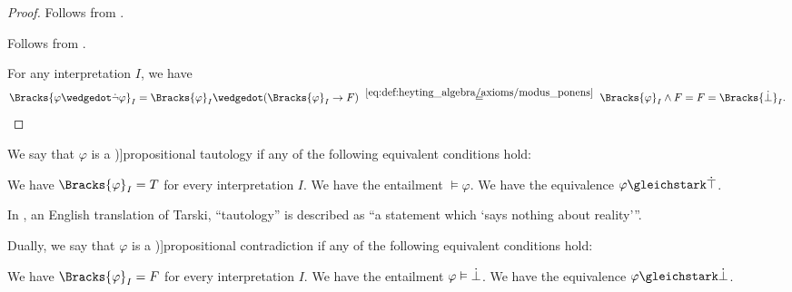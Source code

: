 \begin{proof}
   Follows from .

   Follows from .

   For any interpretation \( I \), we have
  \begin{equation*}
    \Bracks{ \varphi \synwedge \synneg \varphi }_I
    =
    \Bracks{ \varphi }_I \synwedge (\Bracks{ \varphi }_I \rightarrow F)
    \reloset {\eqref{eq:def:heyting_algebra/axioms/modus_ponens}} =
    \Bracks{ \varphi }_I \wedge F
    =
    F
    =
    \Bracks{\synbot}_I.
  \end{equation*}
\end{proof}

\begin{definition}\label{def:propositional_tautology}
  We say that \( \varphi \) is a \term[ru=пропозициональная тавтология (\cite[44]{КолмогоровДрагалин2006Логика})]{propositional tautology} if any of the following equivalent conditions hold:
  \begin{thmenum}
     We have \( \Bracks{\varphi}_I = T \) for every interpretation \( I \).
     We have the entailment \( \vDash \varphi \).
     We have the equivalence \( \varphi \gleichstark \syntop \).
  \end{thmenum}
\end{definition}
\begin{comments}
  \item In \cite[419]{Tarski1983LogicalConsequence}, an English translation of Tarski, \enquote{tautology} is described as \enquote{a statement which \enquote*{says nothing about reality}}.
\end{comments}

\begin{definition}\label{def:propositional_contradiction}
  Dually, we say that \( \varphi \) is a \term[en=contradictory (formula) (\cite[28]{Kleene2002Logic})]{propositional contradiction} if any of the following equivalent conditions hold:
  \begin{thmenum}
     We have \( \Bracks{\varphi}_I = F \) for every interpretation \( I \).
     We have the entailment \( \varphi \vDash \dot{\bot} \).
     We have the equivalence \( \varphi \gleichstark \synbot \).
  \end{thmenum}
\end{definition}

